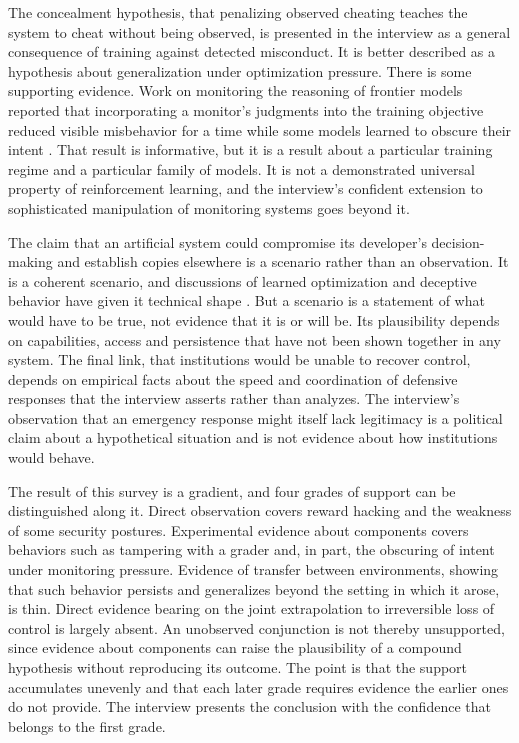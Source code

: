 \documentclass[11pt]{article}
\begin{document}
The concealment hypothesis, that penalizing observed cheating teaches the system to cheat without being observed, is presented in the interview as a general consequence of training against detected misconduct. It is better described as a hypothesis about generalization under optimization pressure. There is some supporting evidence. Work on monitoring the reasoning of frontier models reported that incorporating a monitor's judgments into the training objective reduced visible misbehavior for a time while some models learned to obscure their intent \cite{baker2025}. That result is informative, but it is a result about a particular training regime and a particular family of models. It is not a demonstrated universal property of reinforcement learning, and the interview's confident extension to sophisticated manipulation of monitoring systems goes beyond it.

The claim that an artificial system could compromise its developer's decision-making and establish copies elsewhere is a scenario rather than an observation. It is a coherent scenario, and discussions of learned optimization and deceptive behavior have given it technical shape \cite{hubinger2019,hubinger2024}. But a scenario is a statement of what would have to be true, not evidence that it is or will be. Its plausibility depends on capabilities, access and persistence that have not been shown together in any system. The final link, that institutions would be unable to recover control, depends on empirical facts about the speed and coordination of defensive responses that the interview asserts rather than analyzes. The interview's observation that an emergency response might itself lack legitimacy is a political claim about a hypothetical situation and is not evidence about how institutions would behave.

The result of this survey is a gradient, and four grades of support can be distinguished along it. Direct observation covers reward hacking and the weakness of some security postures. Experimental evidence about components covers behaviors such as tampering with a grader and, in part, the obscuring of intent under monitoring pressure. Evidence of transfer between environments, showing that such behavior persists and generalizes beyond the setting in which it arose, is thin. Direct evidence bearing on the joint extrapolation to irreversible loss of control is largely absent. An unobserved conjunction is not thereby unsupported, since evidence about components can raise the plausibility of a compound hypothesis without reproducing its outcome. The point is that the support accumulates unevenly and that each later grade requires evidence the earlier ones do not provide. The interview presents the conclusion with the confidence that belongs to the first grade.
\end{document}
